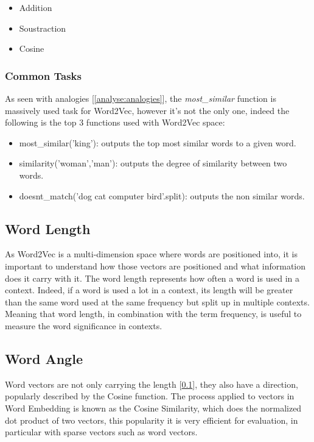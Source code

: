\begin{itemize}
    \setlength\itemsep{0em}
    \item Addition
    \item Soustraction
    \item Cosine
\end{itemize}

\subsubsection{Common Tasks}
As seen with analogies [\ref{analyse:analogies}], the \textit{most\_similar\(\)} function is massively used task for Word2Vec, however it's not the only one, indeed the following is the top 3 functions used with Word2Vec space:

\begin{itemize}
    \setlength\itemsep{0em}
    \item most\_similar('king'): outputs the top most similar words to a given word.
    \item similarity('woman','man'): outputs the degree of similarity between two words.
    \item doesnt\_match('dog cat computer bird'.split\(\)): outputs the non similar words.
\end{itemize}


\subsection{Word Length}
\label{analyse:word-length}
As Word2Vec is a multi-dimension space where words are positioned into, it is important to understand how those vectors are positioned and what information does it carry with it. The word length represents how often a word is used in a context. Indeed, if a word is used a lot in a context, its length will be greater than the same word used at the same frequency but split up in multiple contexts. Meaning that word length, in combination with the term frequency, is useful to measure the word significance in contexts. \cite{article:word2vec-length}

\subsection{Word Angle}
\label{analyse:word-angle}
Word vectors are not only carrying the length [\ref{analyse:word-length}], they also have a direction, popularly described by the Cosine function. The process applied to vectors in Word Embedding is known as the Cosine Similarity, which does the normalized dot product of two vectors, this popularity it is very efficient for evaluation, in particular with sparse vectors such as word vectors.

